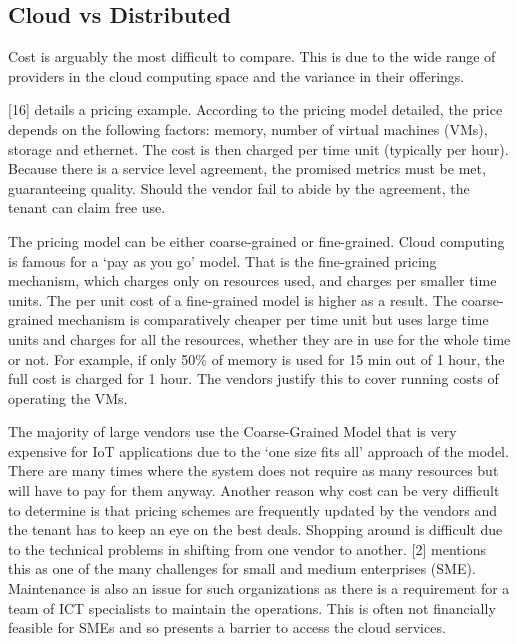 \subsection{Cloud vs Distributed}

Cost is arguably the most difficult to compare. This is due to the wide range of providers in the cloud computing space and the variance in their offerings. 

[16] details a pricing example. According to the pricing model detailed, the price depends on the following factors: memory, number of virtual machines (VMs), storage and ethernet. The cost is then charged per time unit (typically per hour). Because there is a service level agreement, the promised metrics must be met, guaranteeing quality. Should the vendor fail to abide by the agreement, the tenant can claim free use. 

The pricing model can be either coarse-grained or fine-grained. Cloud computing is famous for a ‘pay as you go’ model. That is the fine-grained pricing mechanism, which charges only on resources used, and charges per smaller time units. The per unit cost of a fine-grained model is higher as a result. The coarse-grained mechanism is comparatively cheaper per time unit but uses large time units and charges for all the resources, whether they are in use for the whole time or not. For example, if only 50\% of memory is used for 15 min out of 1 hour, the full cost is charged for 1 hour. The vendors justify this to cover running costs of operating the VMs. 

 
The majority of large vendors use the Coarse-Grained Model that is very expensive for IoT applications due to the ‘one size fits all’ approach of the model. There are many times where the system does not require as many resources but will have to pay for them anyway. Another reason why cost can be very difficult to determine is that pricing schemes are frequently updated by the vendors and the tenant has to keep an eye on the best deals. Shopping around is difficult due to the technical problems in shifting from one vendor to another. [2] mentions this as one of the many challenges for small and medium enterprises (SME). Maintenance is also an issue for such organizations as there is a requirement for a team of ICT specialists to maintain the operations. This is often not financially feasible for SMEs and so presents a barrier to access the cloud services. 



